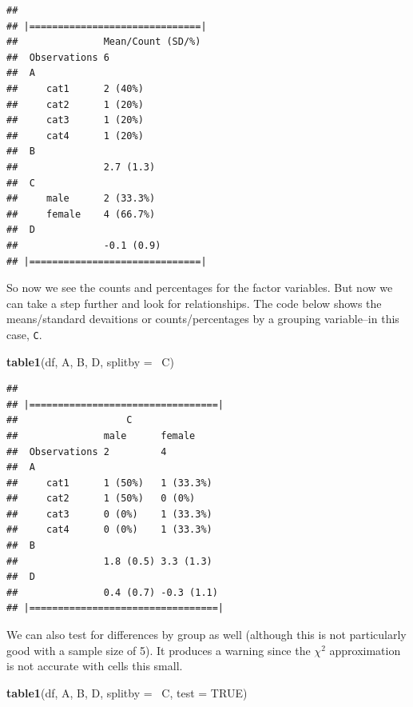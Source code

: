 \documentclass[]{tufte-book}
\newenvironment{Shaded}{}{}
\newcommand{\KeywordTok}[1]{\textcolor[rgb]{0.00,0.44,0.13}{\textbf{#1}}}
\newcommand{\DataTypeTok}[1]{\textcolor[rgb]{0.56,0.13,0.00}{#1}}
\newcommand{\OtherTok}[1]{\textcolor[rgb]{0.00,0.44,0.13}{#1}}
\newcommand{\OperatorTok}[1]{\textcolor[rgb]{0.40,0.40,0.40}{#1}}
\newcommand{\NormalTok}[1]{#1}
\theoremstyle{definition}
\theoremstyle{definition}
\theoremstyle{remark}
\begin{document}
\begin{verbatim}
## 
## |==============================|
##               Mean/Count (SD/%)
##  Observations 6                
##  A                             
##     cat1      2 (40%)          
##     cat2      1 (20%)          
##     cat3      1 (20%)          
##     cat4      1 (20%)          
##  B                             
##               2.7 (1.3)        
##  C                             
##     male      2 (33.3%)        
##     female    4 (66.7%)        
##  D                             
##               -0.1 (0.9)       
## |==============================|
\end{verbatim}

So now we see the counts and percentages for the factor variables. But
now we can take a step further and look for relationships. The code
below shows the means/standard devaitions or counts/percentages by a
grouping variable--in this case, \texttt{C}.

\begin{Shaded}
\begin{Highlighting}[]
\KeywordTok{table1}\NormalTok{(df, A, B, D, }\DataTypeTok{splitby =} \OperatorTok{~}\NormalTok{C)}
\end{Highlighting}
\end{Shaded}

\begin{verbatim}
## 
## |=================================|
##                   C 
##               male      female    
##  Observations 2         4         
##  A                                
##     cat1      1 (50%)   1 (33.3%) 
##     cat2      1 (50%)   0 (0%)    
##     cat3      0 (0%)    1 (33.3%) 
##     cat4      0 (0%)    1 (33.3%) 
##  B                                
##               1.8 (0.5) 3.3 (1.3) 
##  D                                
##               0.4 (0.7) -0.3 (1.1)
## |=================================|
\end{verbatim}

We can also test for differences by group as well (although this is not
particularly good with a sample size of 5). It produces a warning since
the \(\chi^2\) approximation is not accurate with cells this small.

\begin{Shaded}
\begin{Highlighting}[]
\KeywordTok{table1}\NormalTok{(df, A, B, D, }\DataTypeTok{splitby =} \OperatorTok{~}\NormalTok{C, }\DataTypeTok{test =} \OtherTok{TRUE}\NormalTok{)}
\end{Highlighting}
\end{Shaded}
\end{document}
